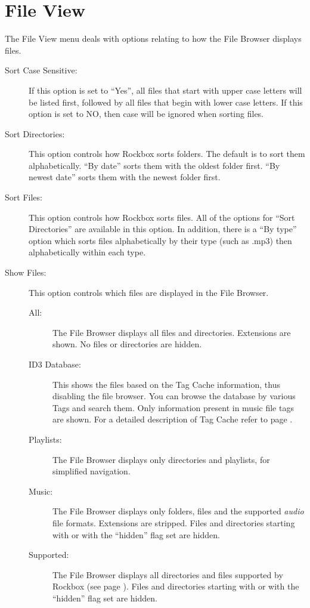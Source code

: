\section{File View}
  The File View menu deals with options relating to how the File Browser 
  displays files.
  \begin{description}
  \item[Sort Case Sensitive:]
    If this option is set to ``Yes'', all files that start with upper case 
    letters will be listed first, followed by all files that begin with lower 
    case letters.  If this option is set to NO, then case will be ignored when 
    sorting files.
  \item[Sort Directories:]
    This option controls how Rockbox sorts folders.  The default is to sort 
    them alphabetically. ``By date'' sorts them with the oldest folder first. 
    ``By newest date'' sorts them with the newest folder first.
    
  \item[Sort Files:]
    This option controls how Rockbox sorts files.  All of the options for 
    ``Sort Directories'' are available in this option.  In addition, there 
    is a ``By type'' option which sorts files alphabetically by their type 
    (such as .mp3) then alphabetically within each type.
    
  \item[\label{ref:ShowFiles}Show Files:]
    This option controls which files are displayed in the File Browser.
    \begin{description}
    \item[All:] The File Browser displays all files and directories. 
      Extensions are shown. No files or directories are hidden.
    \item[ID3 Database:] This shows the files based on the Tag Cache
      information, thus disabling the file browser. You can browse the
      database by various Tags and search them. Only information present
      in music file tags are shown. For a detailed description of Tag Cache
      refer to page \pageref{ref:tagcache}.
    \item[Playlists:] The File Browser displays only directories and playlists,
      for simplified navigation.
    \item[Music:] The File Browser displays only folders,  files 
      and the supported \emph{audio} file formats.  Extensions are stripped.  
      Files and directories starting with  or with the ``hidden'' 
      flag set are hidden.
    \item[Supported:] The File Browser displays all directories and files 
      supported by Rockbox (see page \pageref{ref:Supportedfileformats}).  
      Files and directories starting with  or with the ``hidden'' 
      flag set are hidden.
    \end{description}
    

\end{description}
